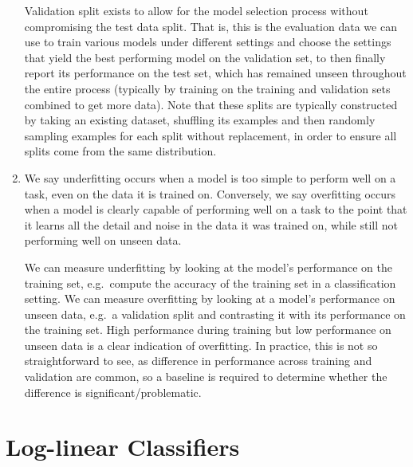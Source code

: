 \documentclass[11pt,a4paper]{article}
\begin{document}
\begin{enumerate}[label=(\alph*)]
          Validation split exists to allow for the model selection process
          without compromising the test data split. That is, this is the
          evaluation data we can use to train various models under different
          settings and choose the settings that yield the best performing model
          on the validation set, to then finally report its performance on the
          test set, which has remained unseen throughout the entire process
          (typically by training on the training and validation sets combined to
          get more data).
          Note that these splits are typically constructed by taking an existing
          dataset, shuffling its examples and then randomly sampling examples
          for each split without replacement, in order to ensure all splits come
          from the same distribution.
    \item We say underfitting occurs when a model is too simple to perform well
          on a task, even on the data it is trained on.
          Conversely, we say overfitting occurs when a model is clearly capable
          of performing well on a task to the point that it learns all the
          detail and noise in the data it was trained on, while still not
          performing well on unseen data.

          We can measure underfitting by looking at the model's performance on
          the training set, e.g.\ compute the accuracy of the training set in a
          classification setting.
          We can measure overfitting by looking at a model's performance on
          unseen data, e.g.\ a validation split and contrasting it with its
          performance on the training set. High performance during training but
          low performance on unseen data is a clear indication of overfitting.
          In practice, this is not so straightforward to see, as difference in
          performance across training and validation are common, so a baseline
          is required to determine whether the difference is
          significant/problematic.
\end{enumerate}

\section{Log-linear Classifiers}
\end{document}
